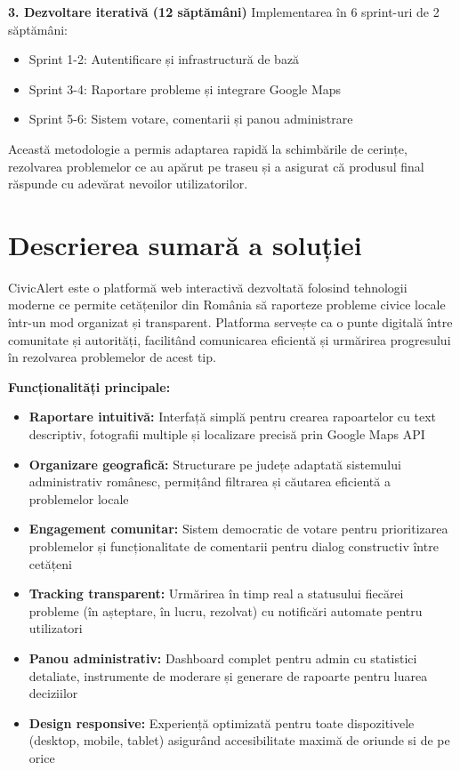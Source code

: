 \documentclass[12pt,a4paper]{report}
\begin{document}
\textbf{3. Dezvoltare iterativă (12 săptămâni)}
Implementarea în 6 sprint-uri de 2 săptămâni:
\begin{itemize}
\item Sprint 1-2: Autentificare și infrastructură de bază
\item Sprint 3-4: Raportare probleme și integrare Google Maps
\item Sprint 5-6: Sistem votare, comentarii și panou administrare
\end{itemize}



Această metodologie a permis adaptarea rapidă la schimbările de cerințe, rezolvarea problemelor ce au apărut pe traseu și a asigurat că produsul final răspunde cu adevărat nevoilor utilizatorilor.

\section*{Descrierea sumară a soluției}

CivicAlert este o platformă web interactivă dezvoltată folosind tehnologii moderne  ce permite cetățenilor din România să raporteze probleme civice locale într-un mod organizat și transparent. Platforma servește ca o punte digitală între comunitate și autorități, facilitând comunicarea eficientă și urmărirea progresului în rezolvarea problemelor de acest tip.

\textbf{Funcționalități principale:}
\begin{itemize}
\item \textbf{Raportare intuitivă:} Interfață simplă pentru crearea rapoartelor cu text descriptiv, fotografii multiple și localizare precisă prin Google Maps API
\item \textbf{Organizare geografică:} Structurare pe județe adaptată sistemului administrativ românesc, permițând filtrarea și căutarea eficientă a problemelor locale
\item \textbf{Engagement comunitar:} Sistem democratic de votare pentru prioritizarea problemelor și funcționalitate de comentarii pentru dialog constructiv între cetățeni
\item \textbf{Tracking transparent:} Urmărirea în timp real a statusului fiecărei probleme (în așteptare, în lucru, rezolvat) cu notificări automate pentru utilizatori
\item \textbf{Panou administrativ:} Dashboard complet pentru admin cu statistici detaliate, instrumente de moderare și generare de rapoarte pentru luarea deciziilor
\item \textbf{Design responsive:} Experiență optimizată pentru toate dispozitivele (desktop, mobile, tablet) asigurând accesibilitate maximă de oriunde si de pe orice
\end{itemize}
\end{document}
